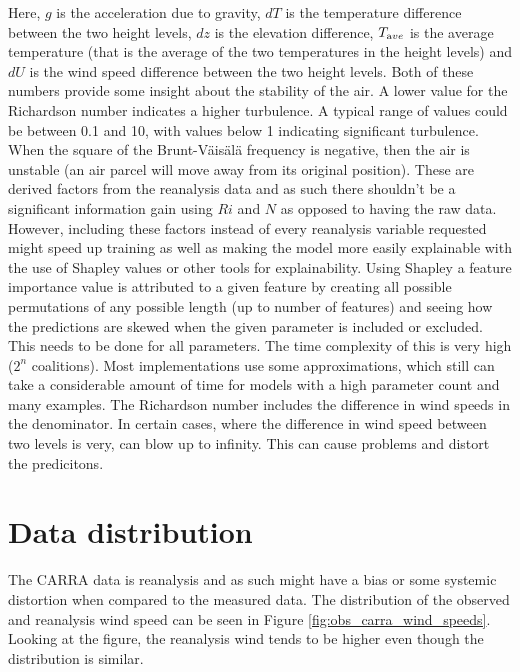 Here, $g$ is the acceleration due to gravity, $dT$ is the temperature difference between the two height levels, $dz$ is the elevation difference, $T_{\textrm ave}$ is the average temperature (that is the average of the two temperatures in the height levels) and $dU$ is the wind speed difference between the two height levels. Both of these numbers provide some insight about the stability of the air. A lower value for the Richardson number indicates a higher turbulence. A typical range of values could be between 0.1 and 10, with values below 1 indicating significant turbulence\cite{richardson_number_skybrary}. When the square of the Brunt-Väisälä frequency is negative, then the air is unstable (an air parcel will move away from its original position)\cite{brunt_vaisala_freq_eumtrain}. These are derived factors from the reanalysis data and as such there shouldn't be a significant information gain using $Ri$ and $N$ as opposed to having the raw data. However, including these factors instead of every reanalysis variable requested might speed up training as well as making the model more easily explainable with the use of Shapley values or other tools for explainability. Using Shapley a feature importance value is attributed to a given feature by creating all possible permutations of any possible length (up to number of features) and seeing how the predictions are skewed when the given parameter is included or excluded. This needs to be done for all parameters. The time complexity of this is very high ($2^n$ coalitions)\cite{shapley_information}. Most implementations use some approximations, which still can take a considerable amount of time for models with a high parameter count and many examples. The Richardson number includes the difference in wind speeds in the denominator. In certain cases, where the difference in wind speed between two levels is very, can blow up to infinity. This can cause problems and distort the predicitons.

\section{Data distribution}

The CARRA data is reanalysis and as such might have a bias or some systemic distortion when compared to the measured data. The distribution of the observed and reanalysis wind speed can be seen in Figure \ref{fig:obs_carra_wind_speeds}. Looking at the figure, the reanalysis wind tends to be higher even though the distribution is similar. 

